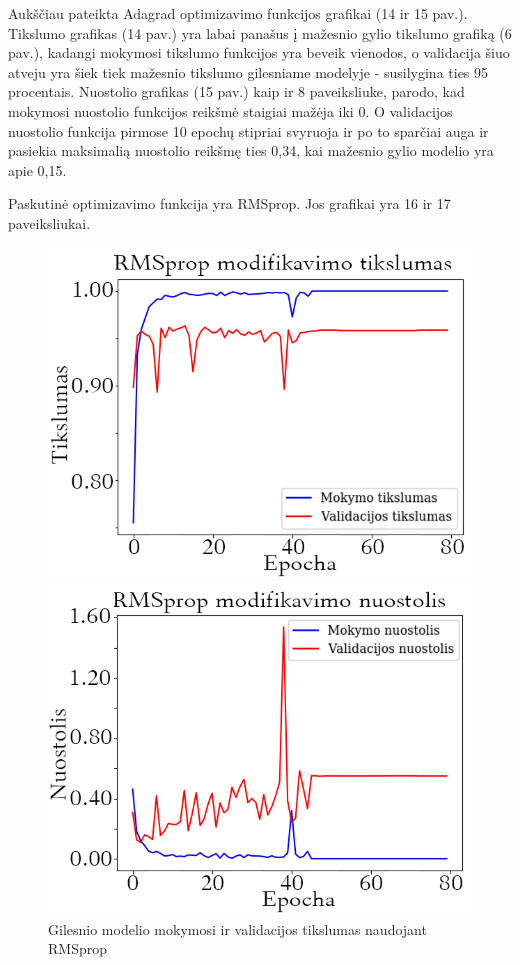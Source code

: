 \documentclass{VUMIFPSkursinis}
\begin{document}
Aukščiau pateikta Adagrad optimizavimo funkcijos grafikai (14 ir 15 pav.). Tikslumo grafikas (14 pav.) yra labai panašus į mažesnio gylio tikslumo grafiką (6 pav.), kadangi mokymosi tikslumo funkcijos yra beveik vienodos, o validacija šiuo atveju yra šiek tiek mažesnio tikslumo gilesniame 
modelyje - susilygina ties 95 procentais.
Nuostolio grafikas (15 pav.) kaip ir 8 paveiksliuke, parodo, kad mokymosi nuostolio funkcijos reikšmė staigiai mažėja iki 0. O validacijos nuostolio funkcija pirmose 10 epochų stipriai svyruoja ir po to sparčiai auga ir pasiekia maksimalią nuostolio 
reikšmę ties 0,34, kai mažesnio gylio modelio yra apie 0,15.

Paskutinė optimizavimo funkcija yra RMSprop. Jos grafikai yra 16 ir 17 paveiksliukai.

\begin{figure}[!htbp]
  \centering
  \begin{minipage}[b]{0.49\textwidth}
    \includegraphics[width=\textwidth]{img/AL/RMSprop_acc1.png}
    \caption{Gilesnio modelio mokymosi ir validacijos tikslumas naudojant RMSprop}
  \end{minipage}
  \begin{minipage}[b]{0.49\textwidth}
    \includegraphics[width=\textwidth]{img/AL/RMSprop_loss1.png}

\end{minipage}
\end{figure}
\end{document}
